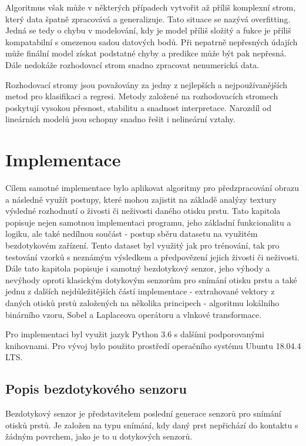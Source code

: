 Algoritmus však může v některých případech vytvořit až příliš komplexní strom, který data špatně zpracovává a generalizuje. Tato situace se nazývá overfitting. Jedná se tedy o chybu v modelování, kdy je model příliš složitý a fukce je příliš kompatabilní s omezenou sadou datových bodů. Při nepatrně nepřesných údajích může finální model získat podstatné chyby a predikce může být pak nepřesná. Dále nedokáže rozhodovací strom snadno zpracovat nenumerická data.

Rozhodovací stromy jsou považovány za jedny z nejlepších a nejpoužívanějších metod pro klasifikaci a regresi. Metody založené na rozhodovacích stromech poskytují vysokou přesnost, stabilitu a snadnost interpretace. Narozdíl od lineárních modelů jsou schopny snadno řešit i nelineární vztahy. \cite{DecisionTrees}
    
\chapter{Implementace}
Cílem samotné implementace bylo aplikovat algoritmy pro předzpracování obrazu a následně využít postupy, které mohou zajistit na základě analýzy textury výsledné rozhodnutí o živosti či neživosti daného otisku prstu. Tato kapitola popisuje nejen samotnou implementaci programu, jeho základní funkcionalitu a logiku, ale také nedílnou součást - postup sběru datasetu na využitém bezdotykovém zařízení. Tento dataset byl využitý jak pro trénování, tak pro testování vzorků s neznámým výsledkem a předpovězení jejich živosti či neživosti. Dále tato kapitola popisuje i samotný bezdotykový senzor, jeho výhody a nevýhody oproti klasickým dotykovým senzorům pro snímání otisku prstu a také jednu z dalších nejdůležitějších částí implementace - extrahované vektory z daných otisků prstů založených na několika principech - algoritmu lokálního binárního vzoru, Sobel a Laplaceova operátoru a vlnkové transformace.

Pro implementaci byl využit jazyk Python 3.6 s dalšími podporovanými knihovnami. Pro vývoj bylo použito prostředí operačního systému Ubuntu 18.04.4 LTS.

\section{Popis bezdotykového senzoru}
Bezdotykový senzor je představitelem poslední generace senzorů pro snímání otisků prstů. Je založen na typu snímání, kdy daný prst nepřichází do kontaktu s žádným povrchem, jako je to u dotykových senzorů. 

